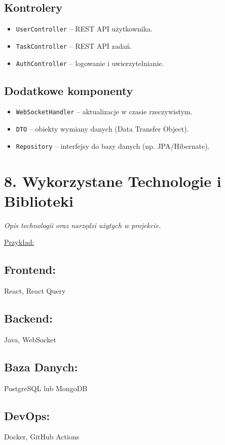 \documentclass[a4paper,12pt]{article}
\begin{document}
\subsection*{Kontrolery}
\begin{itemize}
    \item \texttt{UserController} – REST API użytkownika.
    \item \texttt{TaskController} – REST API zadań.
    \item \texttt{AuthController} – logowanie i uwierzytelnianie.
\end{itemize}

\subsection*{Dodatkowe komponenty}
\begin{itemize}
    \item \texttt{WebSocketHandler} – aktualizacje w czasie rzeczywistym.
    \item \texttt{DTO} – obiekty wymiany danych (Data Transfer Object).
    \item \texttt{Repository} – interfejsy do bazy danych (np. JPA/Hibernate).
\end{itemize}

\section*{8. Wykorzystane Technologie i Biblioteki}
\textit{Opis technologii oraz narzędzi użytych w projekcie.}

\vspace{0.5 cm}
 \noindent
\underline{Przykład:} 
\vspace{0.5 cm}
 \noindent
\subsection*{Frontend:}
React, React Query

\subsection*{Backend:}
Java, WebSocket

\subsection*{Baza Danych:}
PostgreSQL lub MongoDB

\subsection*{DevOps:}
Docker, GitHub Actions
\end{document}
